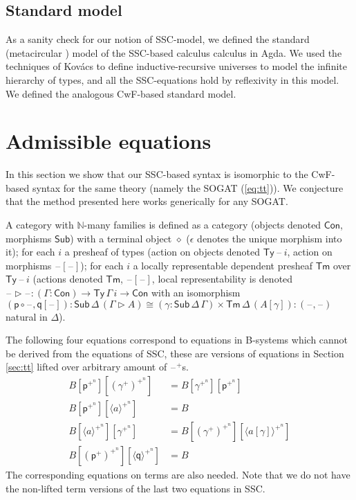 \documentclass[sigplan,10pt,anonymous,review]{acmart}\settopmatter{printfolios=true,printccs=false,printacmref=false}
\newcommand{\ra}{\rightarrow}
\newcommand{\Ty}{\mathsf{Ty}}
\newcommand{\Tm}{\mathsf{Tm}}
\newcommand{\Con}{\mathsf{Con}}
\newcommand{\Sub}{\mathsf{Sub}}
\newcommand{\p}{\mathsf{p}}
\newcommand{\q}{\mathsf{q}}
\newcommand{\ext}{\mathop{\triangleright}}
\newcommand{\N}{\mathbb{N}}
\newcommand{\blank}{\mathord{\hspace{1pt}\text{--}\hspace{1pt}}} %
\begin{document}
\subsection{Standard model}
\label{sec:standard}

As a sanity check for our notion of SSC-model, we defined the standard
(metacircular \cite{DBLP:conf/popl/AltenkirchK16}) model of the
SSC-based calculus calculus in Agda. We used the techniques of Kovács
\cite{DBLP:conf/csl/Kovacs22} to define inductive-recursive universes
to model the infinite hierarchy of types, and all the SSC-equations
hold by reflexivity in this model. We defined the analogous CwF-based
standard model.


\section{Admissible equations}
\label{sec:admissible}

In this section we show that our SSC-based syntax is isomorphic to the
CwF-based syntax for the same theory (namely the SOGAT
(\ref{eq:tt})). We conjecture that the method presented here works
generically for any SOGAT.

\begin{definition}[CwF]\label{def:cwf}
  A category with $\N$-many families is defined as a category (objects
  denoted $\Con$, morphisms $\Sub$) with a terminal object $\diamond$
  ($\epsilon$ denotes the unique morphism into it); for each $i$ a
  presheaf of types (action on objects denoted $\Ty\,\blank\,i$,
  action on morphisms $\blank[\blank]$); for each $i$ a locally
  representable dependent presheaf $\Tm$ over $\Ty\,\blank\,i$
  (actions denoted $\Tm$, $\blank[\blank]$, local representability is
  denoted $\blank\ext\blank : (\Gamma:\Con)\ra\Ty\,\Gamma\,i\ra\Con$
  with an isomorphism
  $
  (\p\circ\blank,\q[\blank]) : \Sub\,\Delta\,(\Gamma\ext A) \cong (\gamma:\Sub\,\Delta\,\Gamma)\times\Tm\,\Delta\,(A[\gamma]) : (\blank,\blank)
  $
  natural in $\Delta$).
\end{definition}

The following four equations correspond to equations in B-systems which cannot
be derived from the equations of SSC, these are versions of equations in Section
\ref{sec:tt} lifted over arbitrary amount of $\blank^+$s.
\begin{equation}\label{eq:lifted}
\begin{aligned}
  B[\p^{+^n}][(\gamma^+)^{+^n}] & = B[\gamma^{+^n}][\p^{+^n}] \\
  B[\p^{+^n}][\langle a \rangle^{+^n}] & = B \\
  B[\langle a \rangle^{+^n}][\gamma^{+^n}] & = B[(\gamma^+)^{+^n}][\langle a[\gamma] \rangle^{+^n}] \\
  B[(\p^+)^{+^n}][\langle\q\rangle^{+^n}] & = B
\end{aligned}
\end{equation}
The corresponding equations on terms are also needed. Note that we do not have
the non-lifted term versions of the last two equations in SSC.
\end{document}
